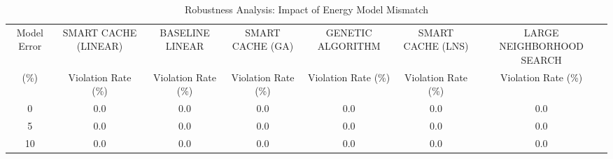 \begin{table}[htbp]
\centering
\caption{Robustness Analysis: Impact of Energy Model Mismatch}
\label{tab:robustness}
\begin{tabular}{ccccccc}
\toprule
Model Error & \multicolumn{1}{c}{SMART CACHE (LINEAR)} & \multicolumn{1}{c}{BASELINE LINEAR} & \multicolumn{1}{c}{SMART CACHE (GA)} & \multicolumn{1}{c}{GENETIC ALGORITHM} & \multicolumn{1}{c}{SMART CACHE (LNS)} & \multicolumn{1}{c}{LARGE NEIGHBORHOOD SEARCH} \\
(\%) & Violation Rate (\%) & Violation Rate (\%) & Violation Rate (\%) & Violation Rate (\%) & Violation Rate (\%) & Violation Rate (\%) \\
\midrule
0 & 0.0 & 0.0 & 0.0 & 0.0 & 0.0 & 0.0 \\
5 & 0.0 & 0.0 & 0.0 & 0.0 & 0.0 & 0.0 \\
10 & 0.0 & 0.0 & 0.0 & 0.0 & 0.0 & 0.0 \\
\bottomrule
\end{tabular}
\end{table}
